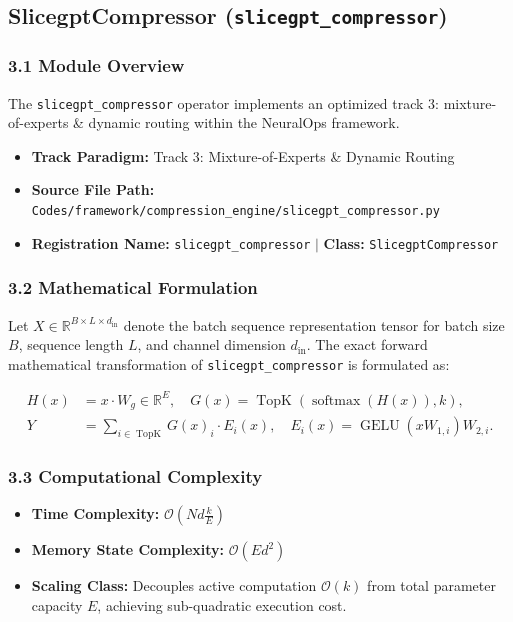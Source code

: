 \subsection{SlicegptCompressor (\texttt{slicegpt\_compressor})}
\label{sec:app_module_slicegpt\_compressor}

\subsubsection*{3.1 Module Overview}
The \texttt{slicegpt\_compressor} operator implements an optimized track 3: mixture-of-experts \& dynamic routing within the NeuralOps framework.
\begin{itemize}
    \item \textbf{Track Paradigm:} Track 3: Mixture-of-Experts & Dynamic Routing
    \item \textbf{Source File Path:} \texttt{Codes/framework/compression\_engine/slicegpt\_compressor.py}
    \item \textbf{Registration Name:} \texttt{slicegpt\_compressor} $\mid$ \textbf{Class:} \texttt{SlicegptCompressor}
\end{itemize}

\subsubsection*{3.2 Mathematical Formulation}
Let $X \in \mathbb{R}^{B \times L \times d_{\text{in}}}$ denote the batch sequence representation tensor for batch size $B$, sequence length $L$, and channel dimension $d_{\text{in}}$. The exact forward mathematical transformation of \texttt{slicegpt\_compressor} is formulated as:

\begin{align}
H(x) &= x \cdot W_g \in \mathbb{R}^{E}, \quad G(x) = \operatorname{TopK}\left(\operatorname{softmax}(H(x)), k\right), \\
Y &= \sum_{i \in \operatorname{TopK}} G(x)_i \cdot E_i(x), \quad E_i(x) = \operatorname{GELU}(x W_{1, i}) W_{2, i}.
\end{align}


\subsubsection*{3.3 Computational Complexity}
\begin{itemize}
    \item \textbf{Time Complexity:} $\mathcal{O}(N d \frac{k}{E})$
    \item \textbf{Memory State Complexity:} $\mathcal{O}(E d^2)$
    \item \textbf{Scaling Class:} Decouples active computation $\mathcal{O}(k)$ from total parameter capacity $E$, achieving sub-quadratic execution cost.
\end{itemize}

